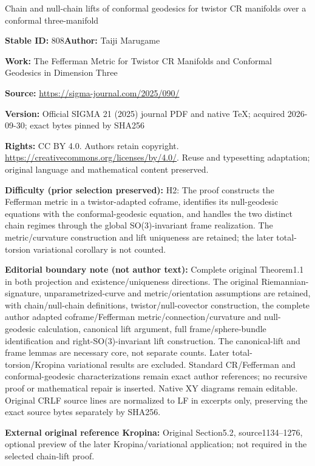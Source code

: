 \documentclass[11pt]{article}
\numberwithin{equation}{section}
\numberwithin{equation}{section}
\begin{document}
\begin{center}\Large Chain and null-chain lifts of conformal geodesics for twistor CR manifolds over a conformal three-manifold\end{center}
\noindent\textbf{Stable ID:} 808\quad\textbf{Author:} Taiji Marugame\par
\noindent\textbf{Work:} The Fefferman Metric for Twistor CR Manifolds and Conformal Geodesics in Dimension Three\par
\noindent\textbf{Source:} \url{https://sigma-journal.com/2025/090/}\par
\noindent\textbf{Version:} Official SIGMA 21 (2025) journal PDF and native TeX; acquired 2026-09-30; exact bytes pinned by SHA256\par
\noindent\textbf{Rights:} CC BY 4.0. Authors retain copyright. \url{https://creativecommons.org/licenses/by/4.0/}. Reuse and typesetting adaptation; original language and mathematical content preserved.\par
\noindent\textbf{Difficulty (prior selection preserved):} {\CJKfont H2: The proof constructs the Fefferman metric in a twistor-adapted coframe, identifies its null-geodesic equations with the conformal-geodesic equation, and handles the two distinct chain regimes through the global SO(3)-invariant frame realization. The metric/curvature construction and lift uniqueness are retained; the later total-torsion variational corollary is not counted.}\par
\medskip\noindent\textbf{Editorial boundary note (not author text):} Complete original Theorem1.1 in both projection and existence/uniqueness directions. The original Riemannian-signature, unparametrized-curve and metric/orientation assumptions are retained, with chain/null-chain definitions, twistor/null-covector construction, the complete author adapted coframe/Fefferman metric/connection/curvature and null-geodesic calculation, canonical lift argument, full frame/sphere-bundle identification and right-SO(3)-invariant lift construction. The canonical-lift and frame lemmas are necessary core, not separate counts. Later total-torsion/Kropina variational results are excluded. Standard CR/Fefferman and conformal-geodesic characterizations remain exact author references; no recursive proof or mathematical repair is inserted. Native XY diagrams remain editable. Original CRLF source lines are normalized to LF in excerpts only, preserving the exact source bytes separately by SHA256.\par
\noindent\textbf{External original reference Kropina:} Original Section5.2, source1134–1276, optional preview of the later Kropina/variational application; not required in the selected chain-lift proof.\par
\end{document}
